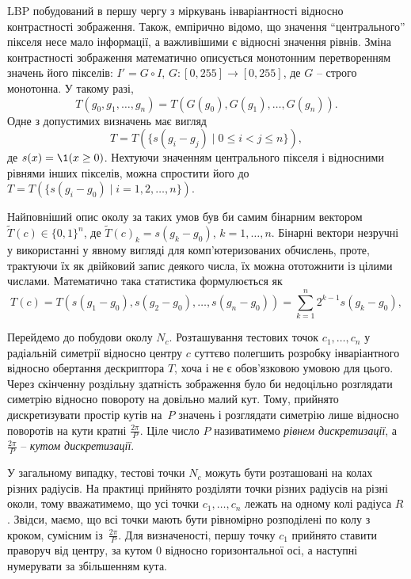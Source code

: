 LBP побудований в першу чергу з міркувань інваріантності відносно контрастності зображення.
Також, емпірично відомо, що значення ``центрального'' пікселя несе мало інформації, а важливішими є відносні значення рівнів.  
Зміна контрастності зображення математично описується монотонним перетворенням значень його пікселів: $I'= G \circ I$, $G \colon [0,255] \to [0,255]$, де $G$ -- строго монотонна.
У такому разі, 
\begin{equation*}
    T(g_0, g_1, \dots , g_n) = T(G(g_0), G(g_1), \dots , G(g_n)).
\end{equation*}
Одне з допустимих визначень має вигляд 
\begin{equation*}
    T = T(\{s(g_i - g_j) \mid 0\le i<j \le n\}), 
\end{equation*}
де $s(x) = \1(x \ge 0)$. 
Нехтуючи значенням центрального пікселя і відносними рівнями інших пікселів, можна спростити його до $T = T(\{s(g_i - g_0) \mid i=1,2,\dots,n\})$.

Найповніший опис околу за таких умов був би самим бінарним вектором $\tilde T(c) \in \{0,1\}^n$,
де $\tilde T(c)_k = s(g_k - g_0)$, $k=1,\dots,n$.
Бінарні вектори незручні у використанні у явному вигляді для комп'ютеризованих обчислень, проте, трактуючи їх як двійковий запис деякого числа, 
їх можна ототожнити із цілими числами. Математично така статистика формулюється як 
\begin{equation}\label{e:ojala-T}
    T(c) = T(s(g_1 - g_0), s(g_2 - g_0), \dots , s(g_n - g_0)) = \sum_{k=1}^n 2^{k-1}s(g_k-g_0),
\end{equation}

Перейдемо до побудови околу $N_c$. 
Розташування тестових точок $c_1,\dots ,c_n$ у 
радіальній симетрії відносно центру $c$ суттєво полегшить розробку інваріантного відносно обертання дескриптора $T$, хоча і не є обов'язковою умовою для цього.
Через скінченну роздільну здатність зображення було би недоцільно розглядати симетрію відносно повороту на довільно малий кут.
Тому, прийнято дискретизувати простір кутів на~$P$ значень і розглядати симетрію лише відносно поворотів на кути кратні $\frac{2\pi}{P}$.
Ціле число $P$ називатимемо \emph{рівнем дискретизації}, а $\frac{2\pi}{P}$ -- \emph{кутом дискретизації}. 

У загальному випадку, тестові точки $N_c$ можуть бути розташовані на колах різних радіусів. 
На практиці прийнято розділяти точки різних радіусів на різні околи, тому вважатимемо, що усі точки $c_1,\dots ,c_n$ лежать на одному колі радіуса $R$.
Звідси, маємо, що всі точки мають бути рівномірно розподілені по колу з кроком, сумісним із~$\frac{2\pi}{P}$.
Для визначеності, першу точку $c_1$ прийнято ставити праворуч від центру, за кутом 0 відносно горизонтальної осі, а наступні нумерувати за збільшенням кута.

